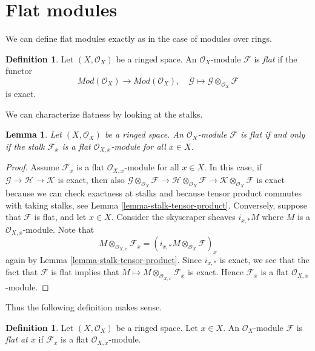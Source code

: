 \documentclass{stacks-project}
\theoremstyle{plain}
\newtheorem{lemma}[subsection]{Lemma}
\theoremstyle{definition}
\newtheorem{definition}[subsection]{Definition}
\theoremstyle{remark}
\numberwithin{equation}{subsection}
\begin{document}
\section{Flat modules}
\label{section-flat}

\noindent
We can define flat modules exactly as in the case of modules over rings.

\begin{definition}
\label{definition-flat}
Let $(X, \mathcal{O}_X)$ be a ringed space.
An $\mathcal{O}_X$-module $\mathcal{F}$ is {\it flat} if the functor
$$
\textit{Mod}(\mathcal{O}_X)
\longrightarrow
\textit{Mod}(\mathcal{O}_X), \quad
\mathcal{G} \mapsto \mathcal{G} \otimes_{\mathcal{O}_X} \mathcal{F}
$$
is exact.
\end{definition}

\noindent
We can characterize flatness by looking at the stalks.

\begin{lemma}
\label{lemma-flat-stalks-flat}
Let $(X, \mathcal{O}_X)$ be a ringed space.
An $\mathcal{O}_X$-module $\mathcal{F}$ is flat
if and only if the stalk $\mathcal{F}_x$ is a flat
$\mathcal{O}_{X, x}$-module for all $x \in X$.
\end{lemma}

\begin{proof}
Assume $\mathcal{F}_x$ is a flat $\mathcal{O}_{X, x}$-module for all
$x \in X$. In this case, if $\mathcal{G} \to \mathcal{H} \to \mathcal{K}$
is exact, then also
$\mathcal{G} \otimes_{\mathcal{O}_X} \mathcal{F} \to
\mathcal{H} \otimes_{\mathcal{O}_X} \mathcal{F} \to
\mathcal{K} \otimes_{\mathcal{O}_X} \mathcal{F}$
is exact because we can check exactness at stalks and because
tensor product commutes with taking stalks, see
Lemma \ref{lemma-stalk-tensor-product}.
Conversely, suppose that $\mathcal{F}$ is flat, and let $x \in X$.
Consider the skyscraper sheaves $i_{x, *} M$ where $M$ is a
$\mathcal{O}_{X, x}$-module. Note that
$$
M \otimes_{\mathcal{O}_{X, x}} \mathcal{F}_x =
\left(i_{x, *} M \otimes_{\mathcal{O}_X} \mathcal{F}\right)_x
$$
again by
Lemma \ref{lemma-stalk-tensor-product}.
Since $i_{x, *}$ is exact, we see that the fact that $\mathcal{F}$
is flat implies that $M \mapsto M \otimes_{\mathcal{O}_{X, x}} \mathcal{F}_x$
is exact. Hence $\mathcal{F}_x$ is a flat $\mathcal{O}_{X, x}$-module.
\end{proof}

\noindent
Thus the following definition makes sense.

\begin{definition}
\label{definition-flat-at-point}
Let $(X, \mathcal{O}_X)$ be a ringed space. Let $x \in X$.
An $\mathcal{O}_X$-module $\mathcal{F}$ is
{\it flat at $x$} if $\mathcal{F}_x$ is a flat
$\mathcal{O}_{X, x}$-module.
\end{definition}
\end{document}
